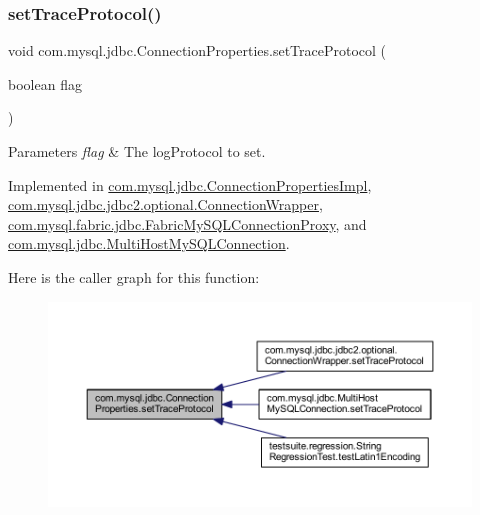 \subsubsection{\texorpdfstring{set\+Trace\+Protocol()}{setTraceProtocol()}}
{\footnotesize\ttfamily void com.\+mysql.\+jdbc.\+Connection\+Properties.\+set\+Trace\+Protocol (\begin{DoxyParamCaption}\item[{boolean}]{flag }\end{DoxyParamCaption})}


\begin{DoxyParams}{Parameters}
{\em flag} & The log\+Protocol to set. \\
\hline
\end{DoxyParams}


Implemented in \mbox{\hyperlink{classcom_1_1mysql_1_1jdbc_1_1_connection_properties_impl_a892bbd7ef78aae4f95ab176b93c1829e}{com.\+mysql.\+jdbc.\+Connection\+Properties\+Impl}}, \mbox{\hyperlink{classcom_1_1mysql_1_1jdbc_1_1jdbc2_1_1optional_1_1_connection_wrapper_a126325f8a5fd6f8b6800a4b8bb9a0131}{com.\+mysql.\+jdbc.\+jdbc2.\+optional.\+Connection\+Wrapper}}, \mbox{\hyperlink{classcom_1_1mysql_1_1fabric_1_1jdbc_1_1_fabric_my_s_q_l_connection_proxy_a52eb83144f87988b4062bccf64d375f7}{com.\+mysql.\+fabric.\+jdbc.\+Fabric\+My\+S\+Q\+L\+Connection\+Proxy}}, and \mbox{\hyperlink{classcom_1_1mysql_1_1jdbc_1_1_multi_host_my_s_q_l_connection_aa661c53930b9d9af7528cf6cf24a2fce}{com.\+mysql.\+jdbc.\+Multi\+Host\+My\+S\+Q\+L\+Connection}}.

Here is the caller graph for this function\+:\nopagebreak
\begin{figure}[H]
\begin{center}
\leavevmode
\includegraphics[width=350pt]{interfacecom_1_1mysql_1_1jdbc_1_1_connection_properties_a304661cd6d7b203e033ad219de96e0d7_icgraph}
\end{center}
\end{figure}
\mbox{\label{interfacecom_1_1mysql_1_1jdbc_1_1_connection_properties_a60f864890c4947c6a45fb0d99cc7c78d}} 
